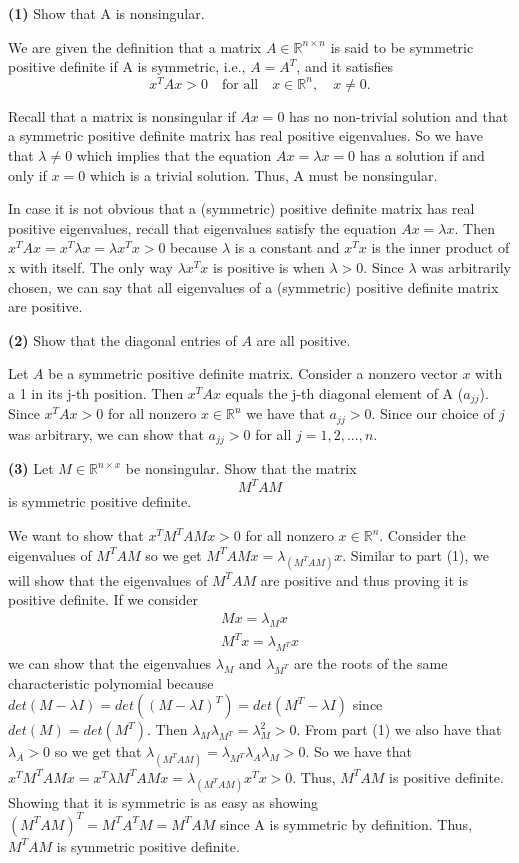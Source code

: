 \documentclass[final,12pt,reqno]{amsart}
\begin{document}
\thispagestyle{fancy}

\textbf{(1)} Show that A is nonsingular.

We are given the definition that a matrix $A \in \mathbb{R}^{n\times n}$ is said to be symmetric positive definite if A is symmetric, i.e., $A = A^T$, and it satisfies
\[
	x^TAx > 0 \quad \text{for all} \quad x \in \mathbb{R}^n, \quad x \neq 0.
\]

Recall that a matrix is nonsingular if $Ax = 0$ has no non-trivial solution and that a symmetric positive definite matrix has real positive eigenvalues. So we have that $\lambda \neq 0$ which implies that the equation $Ax = \lambda x = 0$ has a solution if and only if $x = 0$ which is a trivial solution. Thus, A must be nonsingular.

In case it is not obvious that a (symmetric) positive definite matrix has real positive eigenvalues, recall that eigenvalues satisfy the equation $Ax = \lambda x$. Then $x^TAx = x^T\lambda x = \lambda x^Tx > 0$ because $\lambda$ is a constant and $x^Tx$ is the inner product of x with itself. The only way $\lambda x^Tx$ is positive is when $\lambda > 0$. Since $\lambda$ was arbitrarily chosen, we can say that all eigenvalues of a (symmetric) positive definite matrix are positive.

\textbf{(2)} Show that the diagonal entries of $A$ are all positive.

Let $A$ be a symmetric positive definite matrix. Consider a nonzero vector $x$ with a 1 in its j-th position. Then $x^TAx$ equals the j-th diagonal element of A ($a_{jj}$). Since $x^TAx > 0$ for all nonzero $x \in \mathbb{R}^n$ we have that $a_{jj} > 0$. Since our choice of $j$ was arbitrary, we can show that $a_{jj} > 0$ for all $j = 1,2,...,n$.

\textbf{(3)} Let $M \in \mathbb{R}^{n\times x}$ be nonsingular. Show that the matrix
\[
	M^TAM
\]
is symmetric positive definite.

We want to show that $x^TM^TAMx > 0$ for all nonzero $x \in \mathbb{R}^n$. Consider the eigenvalues of $M^TAM$ so we get $M^TAMx = \lambda_{(M^TAM)}x$. Similar to part (1), we will show that the eigenvalues of $M^TAM$ are positive and thus proving it is positive definite. If we consider
\begin{align*}
	Mx = \lambda_{M}x\\
	M^Tx = \lambda_{M^T}x
\end{align*}
we can show that the eigenvalues $\lambda_{M}$ and $\lambda_{M^T}$ are the roots of the same characteristic polynomial because $det(M-\lambda I) = det((M-\lambda I)^T) = det(M^T-\lambda I)$ since $det(M) = det(M^T)$. Then $\lambda_{M}\lambda_{M^T} = \lambda_{M}^2 > 0$. From part (1) we also have that $\lambda_{A} > 0$ so we get that $\lambda_{(M^TAM)} = \lambda_{M^T}\lambda_{A}\lambda_{M} > 0$. So we have that $x^TM^TAMx = x^T\lambda{M^TAM}x = \lambda_{(M^TAM)}x^Tx > 0$. Thus, $M^TAM$ is positive definite. Showing that it is symmetric is as easy as showing $(M^TAM)^T = M^TA^TM = M^TAM$ since A is symmetric by definition. Thus, $M^TAM$ is symmetric positive definite.
\end{document}
